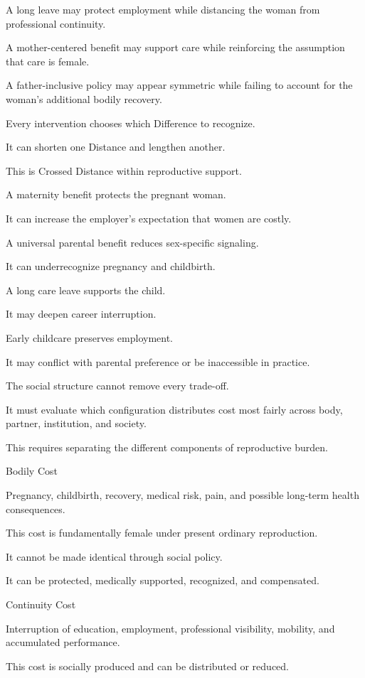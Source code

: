 A long leave may protect employment while distancing the woman from professional continuity.

A mother-centered benefit may support care while reinforcing the assumption that care is female.

A father-inclusive policy may appear symmetric while failing to account for the woman’s additional bodily recovery.

Every intervention chooses which Difference to recognize.

It can shorten one Distance and lengthen another.

This is Crossed Distance within reproductive support.

A maternity benefit protects the pregnant woman.

It can increase the employer’s expectation that women are costly.

A universal parental benefit reduces sex-specific signaling.

It can underrecognize pregnancy and childbirth.

A long care leave supports the child.

It may deepen career interruption.

Early childcare preserves employment.

It may conflict with parental preference or be inaccessible in practice.

The social structure cannot remove every trade-off.

It must evaluate which configuration distributes cost most fairly across body, partner, institution, and society.

This requires separating the different components of reproductive burden.

Bodily Cost

Pregnancy, childbirth, recovery, medical risk, pain, and possible long-term health consequences.

This cost is fundamentally female under present ordinary reproduction.

It cannot be made identical through social policy.

It can be protected, medically supported, recognized, and compensated.

Continuity Cost

Interruption of education, employment, professional visibility, mobility, and accumulated performance.

This cost is socially produced and can be distributed or reduced.

